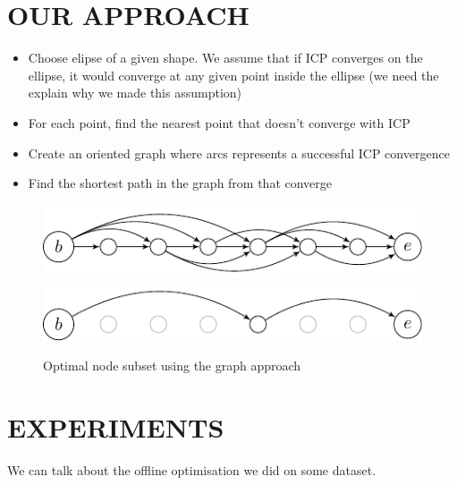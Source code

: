 \documentclass[letterpaper,10 pt,conference]{ieeeconf}
\begin{document}
\section{OUR APPROACH}
\label{approach}

\begin{itemize}
  \item Choose elipse of a given shape. We assume that if ICP converges on the
    ellipse, it would converge at any given point inside the ellipse (we need the explain why we made this assumption)

  \item For each point, find the nearest point that doesn't converge with ICP

  \item Create an oriented graph where arcs represents a successful ICP convergence

  \item Find the shortest path in the graph from that converge

\end{itemize}

\begin{figure}[thpb]
  \centering
  \includegraphics[scale=1.0]{unoptimized-graph}
  \includegraphics[scale=1.0]{optimized-graph}
  \caption{Optimal node subset using the graph approach}
\end{figure}


\section{EXPERIMENTS}
We can talk about the offline optimisation we did on some dataset.
\end{document}
